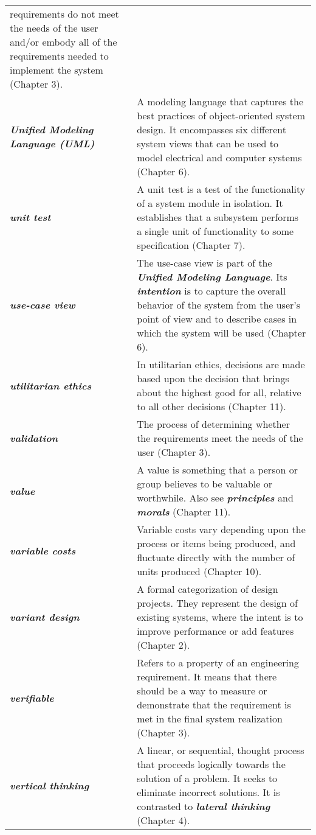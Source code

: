 \begin{longtable}[]{@{}
  >{\raggedright\arraybackslash}p{}
  >{\raggedright\arraybackslash}p{}@{}}
requirements do not meet the needs of the user and/or embody all of the
requirements needed to implement the system (Chapter 3). \\
\emph{\textbf{Unified Modeling Language (UML)}} & A modeling language
that captures the best practices of object-oriented system design. It
encompasses six different system views that can be used to model
electrical and computer systems (Chapter 6). \\
\emph{\textbf{unit test}} & A unit test is a test of the functionality
of a system module in isolation. It establishes that a subsystem
performs a single unit of functionality to some specification (Chapter
7). \\
\emph{\textbf{use-case view}} & The use-case view is part of the
\emph{\textbf{Unified Modeling Language}}. Its \emph{\textbf{intention}}
is to capture the overall behavior of the system from the user's point
of view and to describe cases in which the system will be used (Chapter
6). \\
\emph{\textbf{utilitarian ethics}} & In utilitarian ethics, decisions
are made based upon the decision that brings about the highest good for
all, relative to all other decisions (Chapter 11). \\
\emph{\textbf{validation}} & The process of determining whether the
requirements meet the needs of the user (Chapter 3). \\
\emph{\textbf{value}} & A value is something that a person or group
believes to be valuable or worthwhile. Also see
\emph{\textbf{principles}} and \emph{\textbf{morals}} (Chapter 11). \\
\emph{\textbf{variable costs}} & Variable costs vary depending upon the
process or items being produced, and fluctuate directly with the number
of units produced (Chapter 10). \\
\emph{\textbf{variant design}} & A formal categorization of design
projects. They represent the design of existing systems, where the
intent is to improve performance or add features (Chapter 2). \\
\emph{\textbf{verifiable}} & Refers to a property of an engineering
requirement. It means that there should be a way to measure or
demonstrate that the requirement is met in the final system realization
(Chapter 3). \\
\emph{\textbf{vertical thinking}} & A linear, or sequential, thought
process that proceeds logically towards the solution of a problem. It
seeks to eliminate incorrect solutions. It is contrasted to
\emph{\textbf{lateral thinking}} (Chapter 4). \\

\end{longtable}

